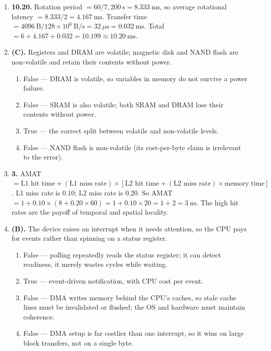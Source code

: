 \documentclass[11pt]{article}
\begin{document}
\begin{enumerate}
\item[\textbf{Q5}] \textbf{10.20.} Rotation period $= 60/7{,}200\ \text{s} = 8.333\ \text{ms}$, so average rotational latency $= 8.333/2 = 4.167\ \text{ms}$. Transfer time $= 4096\ \text{B} / 128 \times 10^{6}\ \text{B/s} = 32\ \mu\text{s} = 0.032\ \text{ms}$. Total $= 6 + 4.167 + 0.032 = 10.199 \approx 10.20\ \text{ms}$.

\item[\textbf{Q6}] \textbf{(C).} Registers and DRAM are volatile; magnetic disk and NAND flash are non-volatile and retain their contents without power.

\begin{enumerate}
  \item[(A)] False --- DRAM is volatile, so variables in memory do not survive a power failure.
  \item[(B)] False --- SRAM is also volatile; both SRAM and DRAM lose their contents without power.
  \item[(C)] True --- the correct split between volatile and non-volatile levels.
  \item[(D)] False --- NAND flash is non-volatile (its cost-per-byte claim is irrelevant to the error).
\end{enumerate}

\item[\textbf{Q7}] \textbf{3.} AMAT $= \text{L1 hit time} + (\text{L1 miss rate}) \times [\text{L2 hit time} + (\text{L2 miss rate}) \times \text{memory time}]$. L1 miss rate is $0.10$; L2 miss rate is $0.20$. So AMAT $= 1 + 0.10 \times (8 + 0.20 \times 60) = 1 + 0.10 \times 20 = 1 + 2 = 3\ \text{ns}$. The high hit rates are the payoff of temporal and spatial locality.

\item[\textbf{Q8}] \textbf{(B).} The device raises an interrupt when it needs attention, so the CPU pays for events rather than spinning on a status register.

\begin{enumerate}
  \item[(A)] False --- polling repeatedly reads the status register; it can detect readiness, it merely wastes cycles while waiting.
  \item[(B)] True --- event-driven notification, with CPU cost per event.
  \item[(C)] False --- DMA writes memory behind the CPU's caches, so stale cache lines must be invalidated or flushed; the OS and hardware must maintain coherence.
  \item[(D)] False --- DMA setup is far costlier than one interrupt, so it wins on large block transfers, not on a single byte.
\end{enumerate}


\end{enumerate}
\end{document}
